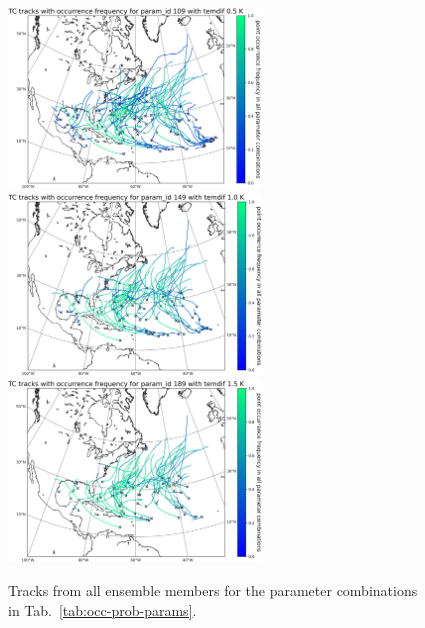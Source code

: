 \begin{figure}[!htb]
	\centering
	\includegraphics[width=0.6\textwidth]{img/tc_tracks_occ_prob_pid_109_temdif_05.png}
	\\[\smallskipamount]
	\includegraphics[width=0.6\textwidth]{img/tc_tracks_occ_prob_pid_149_temdif_10.png}
	\\[\smallskipamount]
	\includegraphics[width=0.6\textwidth]{img/tc_tracks_occ_prob_pid_189_temdif_15.png}
	\caption{Tracks from all ensemble members for the parameter combinations in Tab.~\ref{tab:occ-prob-params}.}
	\label{fig:occ-prob}
\end{figure}

